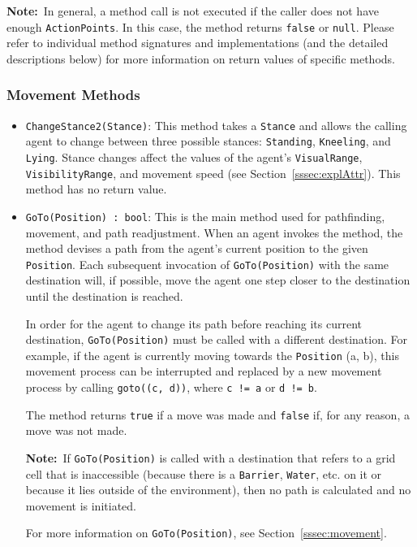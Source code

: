 \documentclass[a4paper,english,DIV=16,11pt,parskip=half,dvipsnames,listof=totoc,index=totoc,bibliography=totoc]{scrartcl}
\begin{document}
\faLightbulbO\: \textbf{Note:}~In general, a method call is not executed if the caller does not have enough \texttt{ActionPoints}. In this case, the method returns \texttt{false} or \texttt{null}. Please refer to individual method signatures and implementations (and the detailed descriptions below) for more information on return values of specific methods.
%
\subsubsection{Movement Methods} \label{sssec:movMeth}
\begin{itemize}
  \item \texttt{ChangeStance2(Stance)}: This method takes a \texttt{Stance} and allows the calling agent to change between three possible stances: \texttt{Standing}, \texttt{Kneeling}, and \texttt{Lying}. Stance changes affect the values of the agent's \texttt{VisualRange}, \texttt{VisibilityRange}, and movement speed (see Section~\ref{sssec:explAttr}). This method has no return value.
  \item \texttt{GoTo(Position) :~bool}: This is the main method used for pathfinding, movement, and path readjustment. When an agent invokes the method, the method devises a path from the agent's current position to the given \texttt{Position}. Each subsequent invocation of \texttt{GoTo(Position)} with the same destination will, if possible, move the agent one step closer to the destination until the destination is reached.
  
  In order for the agent to change its path before reaching its current destination, \texttt{GoTo(Position)} must be called with a different destination. For example, if the agent is currently moving towards the \texttt{Position} (a, b), this movement process can be interrupted and replaced by a new movement process by calling \texttt{goto((c, d))}, where \texttt{c != a} or \texttt{d != b}.
  
  The method returns \texttt{true} if a move was made and \texttt{false} if, for any reason, a move was not made.
  
  \faLightbulbO\: \textbf{Note:}~If \texttt{GoTo(Position)} is called with a destination that refers to a grid cell that is inaccessible (because there is a \texttt{Barrier}, \texttt{Water}, etc. on it or because it lies outside of the environment), then no path is calculated and no movement is initiated.
  
  For more information on \texttt{GoTo(Position)}, see Section~\ref{sssec:movement}.
\end{itemize}
%
\end{document}
